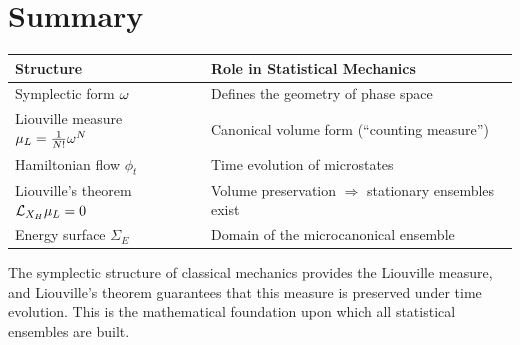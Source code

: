 \section{Summary}

\begin{table}[H]
\centering
\renewcommand{\arraystretch}{1.6}
\begin{tabular}{ll}
\toprule
\textbf{Structure} & \textbf{Role in Statistical Mechanics} \\
\midrule
Symplectic form $\omega$ & Defines the geometry of phase space \\
Liouville measure $\mu_L = \frac{1}{N!}\omega^N$ & Canonical volume form (``counting measure'') \\
Hamiltonian flow $\phi_t$ & Time evolution of microstates \\
Liouville's theorem $\mathcal{L}_{X_H}\mu_L = 0$ & Volume preservation $\Rightarrow$ stationary ensembles exist \\
Energy surface $\Sigma_E$ & Domain of the microcanonical ensemble \\
\bottomrule
\end{tabular}
\end{table}

The symplectic structure of classical mechanics provides the Liouville measure, and Liouville's theorem guarantees that this measure is preserved under time evolution. This is the mathematical foundation upon which all statistical ensembles are built.
